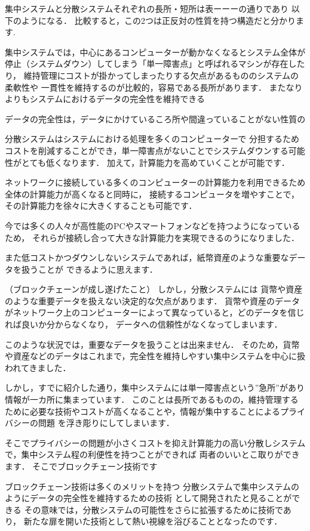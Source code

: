\documentclass[a4paper,12pt]{jsarticle}
\begin{document}
集中システムと分散システムそれぞれの長所・短所は表ーーーの通りであり
以下のようになる．
比較すると，この2つは正反対の性質を持つ構造だと分かります.

集中システムでは，中心にあるコンピューターが動かなくなるとシステム全体が
停止（システムダウン）してしまう「単一障害点」と呼ばれるマシンが存在したり，
維持管理にコストが掛かってしまったりする欠点があるもののシステムの柔軟性や
一貫性を維持するのが比較的，容易である長所があります．
またなりよりもシステムにおけるデータの完全性を維持できる

データの完全性は，データにかけているころ所や間違っていることがない性質の

分散システムはシステムにおける処理を多くのコンピューターで
分担するためコストを削減することができ，単一障害点がないことでシステムダウンする可能性がとても低くなります．
加えて，計算能力を高めていくことが可能です．

ネットワークに接続している多くのコンピューターの計算能力を利用できるため全体の計算能力が高くなると同時に，
接続するコンピュータを増やすことで，その計算能力を徐々に大きくすることも可能です．

今では多くの人々が高性能のPCやスマートフォンなどを持つようになっているため，
それらが接続し合って大きな計算能力を実現できるのうになりました．

また低コストかつダウンしないシステムであれば，紙幣資産のような重要なデータを扱うことが
できるように思えます．

（ブロックチェーンが成し遂げたこと）
しかし，分散システムには
貨幣や資産のような重要データを扱えない決定的な欠点があります．
貨幣や資産のデータがネットワーク上のコンピューターによって異なっていると，どのデータを信じれば良いか分からなくなり，
データへの信頼性がなくなってしまいます．

このような状況では，重要なデータを扱うことは出来ません．
そのため，貨幣や資産などのデータはこれまで，完全性を維持しやすい集中システムを中心に扱われてきました．

しかし，すでに紹介した通り，集中システムには単一障害点という”急所”があり情報が一カ所に集まっています．
このことは長所であるものの，維持管理するために必要な技術やコストが高くなることや，情報が集中することによるプライバシーの問題
を浮き彫りにしてしまいます．

そこでプライバシーの問題が小さくコストを抑え計算能力の高い分散しシステムで，集中システム程の利便性を持つことができれば
両者のいいとこ取りができます．
そこでブロックチェーン技術です

ブロックチェーン技術は多くのメリットを持つ
分散システムで集中システムのようにデータの完全性を維持するための技術
として開発されたと見ることができる
その意味では，分散システムの可能性をさらに拡張するために技術であり，
新たな扉を開いた技術として熱い視線を浴びることとなったのです．
\end{document}
